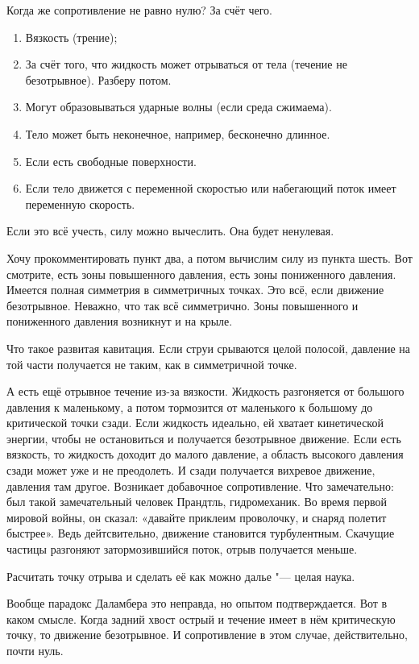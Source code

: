 Когда же сопротивление не равно нулю? За счёт чего.
\begin{enumerate}
  \item Вязкость (трение);
  \item За счёт того, что жидкость может отрываться от тела (течение не безотрывное). Разберу потом.
  \item Могут образовываться ударные волны (если среда сжимаема).
  \item Тело может быть неконечное, например, бесконечно длинное.
  \item Если есть свободные поверхности.
  \item Если тело движется с переменной скоростью или набегающий поток имеет переменную скорость.
\end{enumerate} 
Если это всё учесть, силу можно вычеслить. Она будет ненулевая.

Хочу прокомментировать пункт два, а потом вычислим силу из пункта шесть. Вот смотрите,
есть зоны повышенного давления, есть зоны пониженного давления. Имеется полная симметрия в симметричных точках. Это всё, если движение безотрывное.
Неважно, что так всё симметрично. Зоны повышенного и пониженного давления возникнут и на крыле.

Что такое развитая кавитация. Если струи срываются целой полосой, давление на той части получается не таким, как в симметричной точке.

А есть ещё отрывное течение из-за вязкости.
Жидкость разгоняется от большого давления к маленькому, а потом тормозится от маленького к большому до критической точки сзади. Если жидкость идеально, ей хватает кинетической энергии, чтобы не остановиться и получается безотрывное движение. Если есть вязкость, то жидкость доходит до малого давление, а область высокого давления сзади может уже и не преодолеть. И сзади получается вихревое движение, давления там другое. Возникает добавочное сопротивление. Что замечательно: был такой замечательный человек Прандтль, гидромеханик. Во время первой мировой войны, он сказал: «давайте приклеим проволочку, и снаряд полетит быстрее». Ведь дейтсвительно, движение становится турбулентным. Скачущие частицы разгоняют затормозившийся поток, отрыв получается меньше.

Расчитать точку отрыва и сделать её как можно далье "--- целая наука.

Вообще парадокс Даламбера это неправда, но опытом подтверждается. Вот в каком смысле.
Когда задний хвост острый и течение имеет в нём критическую точку, то движение безотрывное. И сопротивление в этом случае, действительно, почти нуль.

